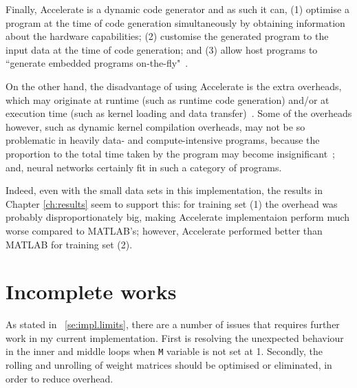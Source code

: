 Finally, Accelerate is a dynamic code generator and as such it can, (1) optimise a program at the time of code generation simultaneously by obtaining information about the hardware capabilities; (2) customise the generated program to the input data at the time of code generation; and (3) allow host programs to ``generate embedded programs on-the-fly"~\cite{ChaKelLee11}.

On the other hand, the disadvantage of using Accelerate is the extra overheads, which may originate at runtime (such as runtime code generation) and/or at execution time (such as kernel loading and data transfer)~\cite{ChaKelLee11}. Some of the overheads however, such as dynamic kernel compilation overheads, may not be so problematic in heavily data- and compute-intensive programs, because the proportion to the total time taken by the program may become insignificant~\cite{ChaKelLee11}; and, neural networks certainly fit in such a category of programs. 

Indeed, even with the small data sets in this implementation, the results in Chapter \ref{ch:results} seem to support this: for training set (1) the overhead was probably disproportionately big, making Accelerate implementaion perform much worse compared to MATLAB's; however, Accelerate performed better than MATLAB for training set (2).

\section{Incomplete works} \label{se:eval.incomplete}

As stated in ~\ref{se:impl.limits}, there are a number of issues that requires further work in my current implementation. First is resolving the unexpected behaviour in the inner and middle loops when \texttt{M} variable is not set at 1. Secondly, the rolling and unrolling of weight matrices should be optimised or eliminated, in order to reduce overhead. 

